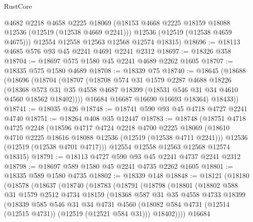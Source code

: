 \begin{lexlean}{RustCore}
\begin{coremodule}
        @4682
        @2218
        @4658
        @2225
        @18069
        (@18153 @4668 @2225 @18159 @18088 @12536 (@12519 (@12538 @4669 @2241)))
        @12536
        (@12519 (@12538 @4659 @4675)))
      @12554
      @12558
      @12563
      @12568
      @12574
      @18315)
@18696 := @18113 @4685 @576 @93 @45 @2241 @4691 @2241 @2312
@18697 := @18326 @358
@18704 := @18697 @575 @1580 @45 @2241 @4689 @2262 @1605
@18707 := @18335 @575 @1580 @4689
@18708 := @18339 @75
@18740 := @18645
    (@18688
      (@18696
        (@18704
          (@18707
            (@18708
              @574
              @31
              @1579
              @2287
              @4688
              @18226
              (@18368
                @573
                @31
                @35
                @4558
                @4687
                @18399
                (@18531 @546 @31 @34 @4610 @4560 @18562 @18402))))
          @16684
          @16687
          @16690
          @16693
          @18364)
        @18433))
@18741 := @18035 @426
@18748 := @18741 @590 @93 @45 @4718 @4727 @2241 @4740
@18751 := @18264 @408 @35 @12447
@18783 := @18748
    (@18751
      @4718
      @4725
      @2248
      (@18596
        @4717
        @4724
        @2218
        @4700
        @2225
        @18069
        (@18610 @4710 @2225 @18616 @18088 @12536 (@12519 (@12538 @4711 @2241)))
        @12536
        (@12519 (@12538 @4701 @4717)))
      @12554
      @12558
      @12563
      @12568
      @12574
      @18315)
@18791 := @18113 @4727 @590 @93 @45 @2241 @4737 @2241 @2312
@18798 := @18697 @589 @1580 @45 @2241 @4735 @2262 @1605
@18801 := @18335 @589 @1580 @4735
@18802 := @18339 @148
@18848 := @18121
    (@18180
      (@18578
        (@18637
          (@18740
            (@18783
              (@18791
                (@18798
                  (@18801
                    (@18802
                      @588
                      @31
                      @1579
                      @2512
                      @4734
                      @18159
                      (@18368
                        @587
                        @31
                        @35
                        @4558
                        @4733
                        @18399
                        (@18339
                          @585
                          @546
                          @31
                          @34
                          @4731
                          @4560
                          (@18082 @584 @4731 (@12514 (@12515 @4731)) (@12519 (@12521 @584 @31)))
                          @18402))))
                  @16684

\end{coremodule}
\end{lexlean}
